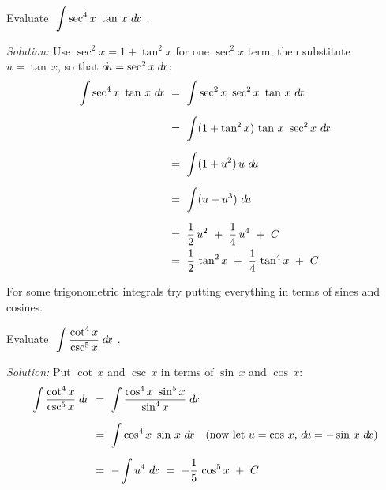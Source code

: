 \begin{exmp}\label{exmp:trigint5}
\noindent Evaluate $~\displaystyle\int \sec^4 x ~\tan\,x~d\!x~$.\vspace{1mm}
\par\noindent\emph{Solution:} Use $\sec^2 x = 1 + \tan^2 x$ for one $\sec^2 x$
term, then substitute $u=\tan\,x$, so that $d\!u=\sec^2 x\;d\!x$:
\begin{align*}
\int \sec^4 x ~\tan\,x~d\!x ~&=~ \int \sec^2 x~\sec^2 x~\tan\,x~d\!x\\[6pt]
&=~ \int (1 + \tan^2 x)\,\tan\,x~\sec^2 x~d\!x\\[6pt]
&=~ \int (1 + u^2)\,u~d\!u\\[6pt]
&=~ \int (u + u^3)~d\!u\\[6pt]
&=~ \frac{1}{2}\,u^2 ~+~ \frac{1}{4}\,u^4 ~+~ C\\
&=~ \frac{1}{2}\,\tan^2 x ~+~ \frac{1}{4}\,\tan^4 x ~+~ C
\end{align*}
\end{exmp}
\divider
\newpage
For some trigonometric integrals try putting everything in terms of sines and
cosines.
\begin{exmp}\label{exmp:trigint6}
\noindent Evaluate $~\displaystyle\int \dfrac{\cot^4 x}{\csc^5 x}\;d\!x~$.\vspace{1mm}
\par\noindent\emph{Solution:} Put $\cot\,x$ and $\csc\,x$ in terms of $\sin\,x$
and $\cos\,x$:
\begin{align*}
\int \frac{\cot^4x}{\csc^5 x}\;d\!x ~&=~ \int \frac{\cos^4x~\sin^5 x}{\sin^4 x}\;d\!x\\[6pt]
&=~ \int \cos^4 x~\sin\,x~d\!x\quad\text{(now let $u=\cos\,x$, $d\!u=-\sin\,x~d\!x$)}\\[6pt]
&=~ -\int u^4~d\!x ~=~ -\frac{1}{5}\,\cos^5 x ~+~ C
\end{align*}
\end{exmp}
\divider
\vspace{3mm}
\startexercises\label{sec6dot2}
